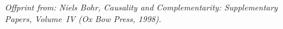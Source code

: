 \documentclass[12pt,a4paper]{article}
\begin{document}
\thispagestyle{fancy}
{\footnotesize\itshape Offprint from: Niels Bohr, \emph{Causality and Complementarity: Supplementary Papers}, Volume~IV
 (Ox Bow Press, 1998).\par}
\medskip


\end{document}
